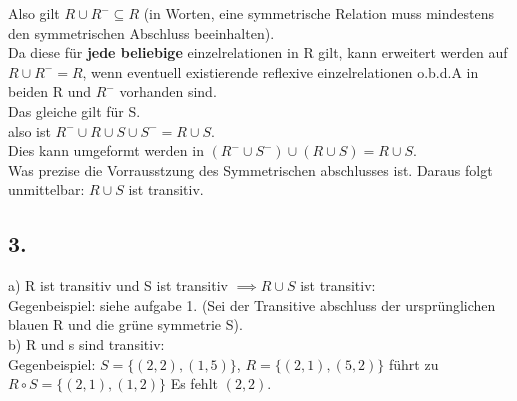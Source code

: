 \documentclass{article}
\begin{document}
	Also gilt $R\cup R^-\subseteq R$ (in Worten, eine symmetrische Relation muss mindestens den symmetrischen Abschluss beeinhalten).\\
	Da diese für \textbf{jede beliebige} einzelrelationen in R gilt, kann erweitert werden auf $R\cup R^- = R$, wenn eventuell existierende reflexive einzelrelationen o.b.d.A in beiden R und $R^-$ vorhanden sind.\\
	Das gleiche gilt für S.\\
	also ist $R^-\cup R\cup S\cup S^-= R\cup S$.\\
	Dies kann umgeformt werden in $(R^-\cup S^-)\cup (R\cup S)= R\cup S$.\\
	Was prezise die Vorrausstzung des Symmetrischen abschlusses ist. Daraus folgt unmittelbar: $R\cup S$ ist transitiv.\\
	\subsection{3.}
	a) R ist transitiv und S ist transitiv $\implies R\cup S$ ist transitiv:\\
	Gegenbeispiel: siehe aufgabe 1. (Sei der Transitive abschluss der ursprünglichen blauen R und die grüne symmetrie S).\\
	b) R und s sind transitiv:\\
	Gegenbeispiel: $S=\{(2,2),(1,5)\}$, $R=\{(2,1),(5,2)\}$ führt zu $R\circ S = \{(2,1),(1,2)\}$ Es fehlt $(2,2)$.\\
\end{document}
